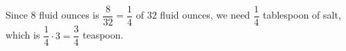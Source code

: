 Since $8$ fluid ounces is $\dfrac{8}{32}=\dfrac14$ of $32$ fluid ounces, we need $\dfrac14$ tablespoon of salt, which is $\dfrac14\cdot3=\boxed{\dfrac34}$ teaspoon.
